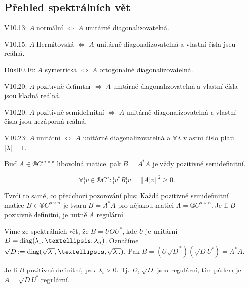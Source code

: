 \documentclass[12pt]{article}                   %
\begin{document}
    \subsection{Přehled spektrálních vět}
        \begin{poznamka}
            V10.13: $A$ normální $\Leftrightarrow$ $A$ unitárně diagonalizovatelná.

            V10.15: $A$ Hermitovská $\Leftrightarrow$ $A$ unitárně diagonalizovatelná a vlastní čísla jsou reálná.

            Důsl10.16: $A$ symetrická $\Leftrightarrow$ $A$ ortogonálně diagonalizovatelná.

            V10.20: $A$ pozitivně definitní $\Leftrightarrow$ $A$ unitárně diagonalizovatelná a vlastní čísla jsou kladná reálná.

            V10.20: $A$ pozitivně semidefinitní $\Leftrightarrow$ $A$ unitárně diagonalizovatelná a vlastní čísla jsou nezáporná reálná.

            V10.23: $A$ unitární $\Leftrightarrow$ $A$ unitárně diagonalizovatelná a $\forall \lambda$ vlastní číslo platí $|\lambda|=1$.
        \end{poznamka}

        
        \begin{pozorovani}
            Buď $A \in ®C^{m \times n}$ libovolná matice, pak $B = A^*A$ je vždy pozitivně semidefinitní.

            \begin{dukazin}
                $$ \forall ¦v \in ®C^n: ¦v^*B¦v = ||A¦v||^2 ≥ 0. $$ 
            \end{dukazin}
        \end{pozorovani}

        \begin{tvrzeni}
            Tvrdí to samé, co předchozí pozorování plus: Každá pozitivně semidefinitní matice $B \in ®C^{n \times n}$ je tvaru $B=A^*A$ pro nějakou matici $A = ®C^{n \times n}$. Je-li $B$ pozitivně definitní, je nutně $A$ regulární.

            \begin{dukazin}
                Víme ze spektrálních vět, že $B = UOU^*$, kde $U$ je unitární, $D = \diag(\lambda_1, …, \lambda_n)$. Označíme $\sqrt{D} := \diag(\sqrt{\lambda_1}, …, \sqrt{\lambda_n})$. Pak $B = (U\sqrt{D}^*)(\sqrt{D}U^*) = A^*A$.

                Je-li $B$ pozitivně definitní, pak $\lambda_i > 0$. Tj. $D$, $\sqrt{D}$ jsou regulární, tím pádem je $A = \sqrt{D}U^*$ regulární.
            \end{dukazin}
        \end{tvrzeni}
\end{document}
